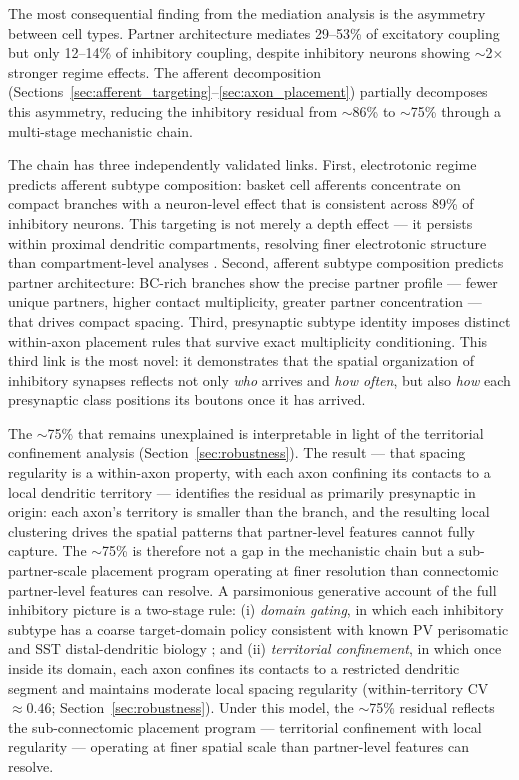 \documentclass[11pt]{article}
\begin{document}
The most consequential finding from the mediation analysis is the asymmetry between cell types. Partner architecture mediates 29--53\% of excitatory coupling but only 12--14\% of inhibitory coupling, despite inhibitory neurons showing $\sim$2$\times$ stronger regime effects. The afferent decomposition (Sections~\ref{sec:afferent_targeting}--\ref{sec:axon_placement}) partially decomposes this asymmetry, reducing the inhibitory residual from $\sim$86\% to $\sim$75\% through a multi-stage mechanistic chain.

The chain has three independently validated links. First, electrotonic regime predicts afferent subtype composition: basket cell afferents concentrate on compact branches with a neuron-level effect that is consistent across 89\% of inhibitory neurons. This targeting is not merely a depth effect --- it persists within proximal dendritic compartments, resolving finer electrotonic structure than compartment-level analyses \citep{schneider2023}. Second, afferent subtype composition predicts partner architecture: BC-rich branches show the precise partner profile --- fewer unique partners, higher contact multiplicity, greater partner concentration --- that drives compact spacing. Third, presynaptic subtype identity imposes distinct within-axon placement rules that survive exact multiplicity conditioning. This third link is the most novel: it demonstrates that the spatial organization of inhibitory synapses reflects not only \textit{who} arrives and \textit{how often}, but also \textit{how} each presynaptic class positions its boutons once it has arrived.

The $\sim$75\% that remains unexplained is interpretable in light of the territorial confinement analysis (Section~\ref{sec:robustness}). The result --- that spacing regularity is a within-axon property, with each axon confining its contacts to a local dendritic territory --- identifies the residual as primarily presynaptic in origin: each axon's territory is smaller than the branch, and the resulting local clustering drives the spatial patterns that partner-level features cannot fully capture. The $\sim$75\% is therefore not a gap in the mechanistic chain but a sub-partner-scale placement program operating at finer resolution than connectomic partner-level features can resolve. A parsimonious generative account of the full inhibitory picture is a two-stage rule: (i) \textit{domain gating}, in which each inhibitory subtype has a coarse target-domain policy consistent with known PV perisomatic and SST distal-dendritic biology \citep{schneider2023}; and (ii) \textit{territorial confinement}, in which once inside its domain, each axon confines its contacts to a restricted dendritic segment and maintains moderate local spacing regularity (within-territory CV $\approx 0.46$; Section~\ref{sec:robustness}). Under this model, the $\sim$75\% residual reflects the sub-connectomic placement program --- territorial confinement with local regularity --- operating at finer spatial scale than partner-level features can resolve.
\end{document}
